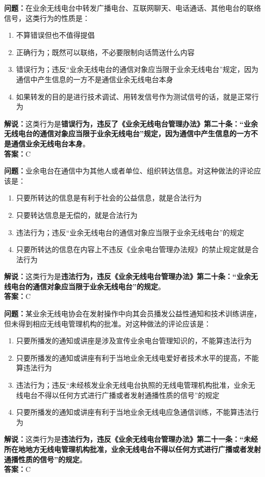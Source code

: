 \bigskip


\noindent\textbf{问题：}在业余无线电台中转发广播电台、互联网聊天、电话通话、其他电台的联络信号，这类行为的性质是：
\begin{enumerate}[label=\Alph*), leftmargin=3em]
	\item 不算错误但也不值得提倡
	\item 正确行为；既然可以联络，不必要限制向话筒送什么内容
	\item 错误行为；违反“业余无线电台的通信对象应当限于业余无线电台”规定，因为通信中产生信息的一方不是通信业余无线电台本身
	\item 如果转发的目的是进行技术调试、用转发信号作为测试信号的话，就是正常行为
\end{enumerate}
\noindent\textbf{解说：}这类行为是\textbf{错误行为，违反了《业余无线电台管理办法》第二十条：“业余无线电台的通信对象应当限于业余无线电台”规定，因为通信中产生信息的一方不是通信业余无线电台本身}。\\\noindent\textbf{答案：}C


\bigskip


\noindent\textbf{问题：}业余电台在通信中为其他人或者单位、组织转达信息。对这种做法的评论应该是：
\begin{enumerate}[label=\Alph*), leftmargin=3em]
	\item 只要所转达的信息是有利于社会的公益信息，就是合法行为
	\item 只要转达信息是无偿的，就是合法行为
	\item 违法行为；违反“业余无线电台的通信对象应当限于业余无线电台”的规定
	\item 只要所转达的信息在内容上不违反《业余电台管理办法规》的禁止规定就是合法行为
\end{enumerate}
\noindent\textbf{解说：}这类行为是\textbf{违法行为，违反《业余无线电台管理办法》第二十条：“业余无线电台的通信对象应当限于业余无线电台”的规定}。\\\noindent\textbf{答案：}C



\bigskip


\noindent\textbf{问题：}某业余无线电协会在发射操作中向其会员播发公益性通知和技术训练讲座，但未得到相应无线电管理机构的批准。对这种做法的评论应该是：
\begin{enumerate}[label=\Alph*), leftmargin=3em]
	\item 只要所播发的通知或讲座是涉及宣传业余电台管理知识的，不能算违法行为
	\item 只要所播发的通知或讲座有利于当地业余无线电爱好者技术水平的提高，不能算违法行为
	\item 违法行为；违反“未经核发业余无线电台执照的无线电管理机构批准，业余无线电台不得以任何方式进行广播或者发射通播性质的信号”的规定
	\item 只要所播发的通知或讲座有利于当地业余无线电应急通信训练，不能算违法行为
\end{enumerate}
\noindent\textbf{解说：}这类行为是\textbf{违法行为，违反《业余无线电台管理办法》第二十一条：“未经所在地地方无线电管理机构批准，业余无线电台不得以任何方式进行广播或者发射通播性质的信号”的规定}。\\\noindent\textbf{答案：}C



